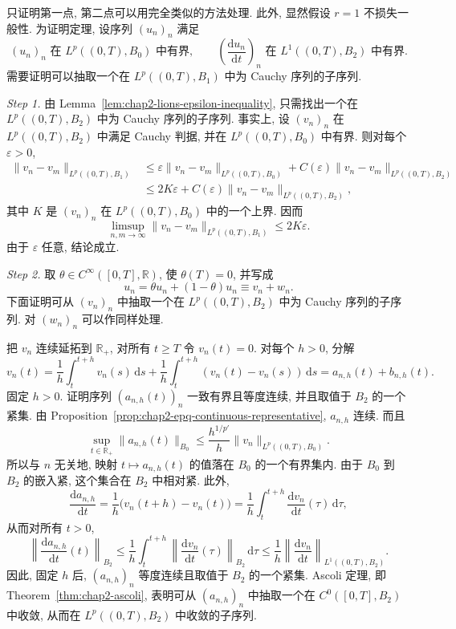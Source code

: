\begin{Proof}
只证明第一点, 第二点可以用完全类似的方法处理. 此外, 显然假设 $r=1$ 不损失一般性. 为证明定理, 设序列 $(u_n)_n$ 满足
\[
 (u_n)_n\text{ 在 }L^p((0,T),B_0)\text{ 中有界},
 \qquad
 \left(\frac{\mathrm{d}u_n}{\mathrm{d}t}\right)_n
 \text{ 在 }L^1((0,T),B_2)\text{ 中有界}.
\]
需要证明可以抽取一个在 $L^p((0,T),B_1)$ 中为 Cauchy 序列的子序列.

\emph{Step 1.} 由 Lemma~\ref{lem:chap2-lions-epsilon-inequality}, 只需找出一个在 $L^p((0,T),B_2)$ 中为 Cauchy 序列的子序列. 事实上, 设 $(v_n)_n$ 在 $L^p((0,T),B_2)$ 中满足 Cauchy 判据, 并在 $L^p((0,T),B_0)$ 中有界. 则对每个 $\varepsilon>0$,
\begin{align*}
 \|v_n-v_m\|_{L^p((0,T),B_1)}
 &\leq\varepsilon\|v_n-v_m\|_{L^p((0,T),B_0)}
 +C(\varepsilon)\|v_n-v_m\|_{L^p((0,T),B_2)}\\
 &\leq2K\varepsilon
 +C(\varepsilon)\|v_n-v_m\|_{L^p((0,T),B_2)},
\end{align*}
其中 $K$ 是 $(v_n)_n$ 在 $L^p((0,T),B_0)$ 中的一个上界. 因而
\[
 \limsup_{n,m\to\infty}\|v_n-v_m\|_{L^p((0,T),B_1)}
 \leq2K\varepsilon.
\]
由于 $\varepsilon$ 任意, 结论成立.

\emph{Step 2.} 取 $\theta\in C^\infty([0,T],\mathbb{R})$, 使 $\theta(T)=0$, 并写成
\[
 u_n=\theta u_n+(1-\theta)u_n\equiv v_n+w_n.
\]
下面证明可从 $(v_n)_n$ 中抽取一个在 $L^p((0,T),B_2)$ 中为 Cauchy 序列的子序列. 对 $(w_n)_n$ 可以作同样处理.

把 $v_n$ 连续延拓到 $\mathbb{R}_+$, 对所有 $t\geq T$ 令 $v_n(t)=0$. 对每个 $h>0$, 分解
\[
 v_n(t)=\frac1h\int_t^{t+h}v_n(s)\,\mathrm{d}s
 +\frac1h\int_t^{t+h}(v_n(t)-v_n(s))\,\mathrm{d}s
 =a_{n,h}(t)+b_{n,h}(t).
\]
固定 $h>0$. 证明序列 $(a_{n,h}(t))_n$ 一致有界且等度连续, 并且取值于 $B_2$ 的一个紧集. 由 Proposition~\ref{prop:chap2-epq-continuous-representative}, $a_{n,h}$ 连续. 而且
\[
 \sup_{t\in\mathbb{R}_+}\|a_{n,h}(t)\|_{B_0}
 \leq\frac{h^{1/p'}}{h}\|v_n\|_{L^p((0,T),B_0)}.
\]
所以与 $n$ 无关地, 映射 $t\mapsto a_{n,h}(t)$ 的值落在 $B_0$ 的一个有界集内. 由于 $B_0$ 到 $B_2$ 的嵌入紧, 这个集合在 $B_2$ 中相对紧. 此外,
\[
 \frac{\mathrm{d}a_{n,h}}{\mathrm{d}t}
 =\frac1h\bigl(v_n(t+h)-v_n(t)\bigr)
 =\frac1h\int_t^{t+h}\frac{\mathrm{d}v_n}{\mathrm{d}t}(\tau)\,\mathrm{d}\tau,
\]
从而对所有 $t>0$,
\[
 \left\|\frac{\mathrm{d}a_{n,h}}{\mathrm{d}t}(t)\right\|_{B_2}
 \leq\frac1h\int_t^{t+h}
 \left\|\frac{\mathrm{d}v_n}{\mathrm{d}t}(\tau)\right\|_{B_2}\,\mathrm{d}\tau
 \leq\frac1h
 \left\|\frac{\mathrm{d}v_n}{\mathrm{d}t}\right\|_{L^1((0,T),B_2)}.
\]
因此, 固定 $h$ 后, $(a_{n,h})_n$ 等度连续且取值于 $B_2$ 的一个紧集. Ascoli 定理, 即 Theorem~\ref{thm:chap2-ascoli}, 表明可从 $(a_{n,h})_n$ 中抽取一个在 $C^0([0,T],B_2)$ 中收敛, 从而在 $L^p((0,T),B_2)$ 中收敛的子序列.


\end{Proof}
